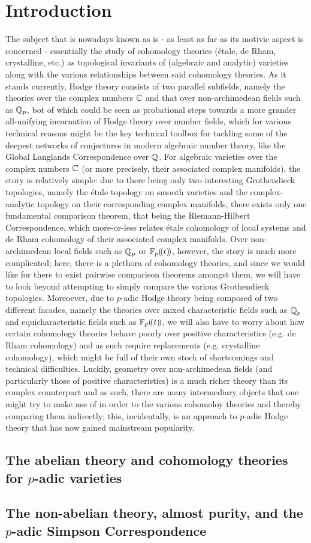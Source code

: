\chapter{Introduction}
    The subject that is nowadays known as  is - as least as far as its motivic aspect is concerned - essentially the study of cohomology theories (\'etale, de Rham, crystalline, etc.) as topological invariants of (algebraic and analytic) varieties along with the various relationships between said cohomology theories. As it stands currently, Hodge theory consists of two parallel subfields, namely the theories over the complex numbers $\mathbb{C}$ and that over non-archimedean fields such as $\mathbb{Q}_p$, bot of which could be seen as probational steps towards a more grander all-unifying incarnation of Hodge theory over number fields, which for various technical reasons might be the key technical toolbox for tackling some of the deepest networks of conjectures in modern algebraic number theory, like the Global Langlands Correspondence over $\mathbb{Q}$. For algebraic varieties over the complex numbers $\mathbb{C}$ (or more precisely, their associated complex manifolds), the story is relatively simple: due to there being only two interesting Grothendieck topologies, namely the \'etale topology on smooth varieties and the complex-analytic topology on their corresponding complex manifolds, there exists only one fundamental comparison theorem, that being the Riemann-Hilbert Correspondence, which more-or-less relates \'etale cohomology of local systems and de Rham cohomology of their associated complex manifolds. Over non-archimedean local fields such as $\mathbb{Q}_p$ or $\mathbb{F}_p(\!(t)\!)$, however, the story is much more complicated; here, there is a plethora of cohomology theories, and since we would like for there to exist pairwise comparison theorems amongst them, we will have to look beyond attempting to simply compare the various Grothendieck topologies. Moreoever, due to $p$-adic Hodge theory being composed of two different facades, namely the theories over mixed characteristic fields such as $\mathbb{Q}_p$ and equicharacteristic fields such as $\mathbb{F}_p(\!(t)\!)$, we will also have to worry about how certain cohomology theories behave poorly over positive characteristics (e.g. de Rham cohomology) and as such require replacements (e.g. crystalline cohomology), which might be full of their own stock of shortcomings and technical difficulties. Luckily, geometry over non-archimedean fields (and particularly those of positive characteristics) is a much richer theory than its complex counterpart and as such, there are many intermediary objects that one might try to make use of in order to  the various cohomoloy theories and thereby comparing them indirectly; this, incidentally, is an approach to $p$-adic Hodge theory that has now gained mainstream popularity.
    
    \section{The abelian theory and cohomology theories for \texorpdfstring{$p$}{}-adic varieties}
    
    \section{The non-abelian theory, almost purity, and the \texorpdfstring{$p$}{}-adic Simpson Correspondence}
